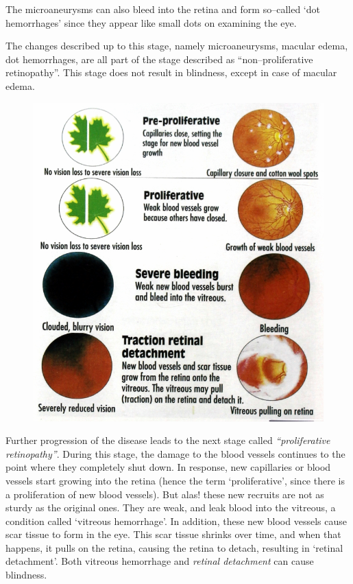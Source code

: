 The microaneurysms can also bleed into the retina and form so–called ‘dot hemorrhages’ since they appear like small dots on examining the eye.

The changes described up to this stage, namely microaneurysms, macular edema, dot hemorrhages, are all part of the stage described as “non–proliferative retinopathy”. This stage does not result in blindness, except in case of macular edema.

\begin{figure}
\caption{}
\includegraphics{images/055.jpg}
\end{figure}

Further progression of the disease leads to the next stage called \textit{“proliferative retinopathy”}. During this stage, the damage to the blood vessels continues to the point where they completely shut down. In response, new capillaries or blood vessels start growing into the retina (hence the term ‘proliferative’, since there is a proliferation of new blood vessels). But alas! these new recruits are not as sturdy as the original ones. They are weak, and leak blood into the vitreous, a condition called ‘vitreous hemorrhage’. In addition, these new blood vessels cause scar tissue to form in the eye. This scar tissue shrinks over time, and when that happens, it pulls on the retina, causing the retina to detach, resulting in ‘retinal detachment’. Both vitreous hemorrhage and \textit{retinal detachment} can cause blindness.

